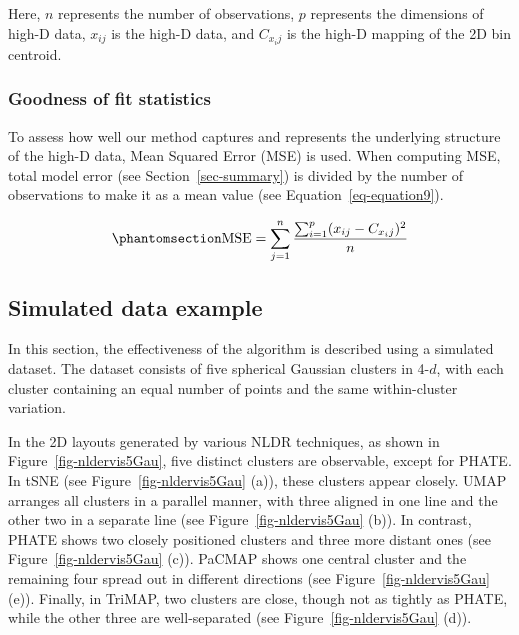 \documentclass[
  12pt]{article}
\begin{document}
Here, \(n\) represents the number of observations, \(p\) represents the
dimensions of high-D data, \(x_{ij}\) is the high-D data, and
\(C_{x_ij}\) is the high-D mapping of the 2D bin centroid.

\subsubsection{Goodness of fit statistics}\label{sec-goodfit}

To assess how well our method captures and represents the underlying
structure of the high-D data, Mean Squared Error (MSE) is used. When
computing MSE, total model error (see Section~\ref{sec-summary}) is
divided by the number of observations to make it as a mean value (see
Equation~\ref{eq-equation9}).

\begin{equation}\phantomsection\label{eq-equation9}{
\text{MSE} = \sum_{j = 1}^{n} \frac{\sum_{i = 1}^{p} (x_{ij} - C_{x_ij})^2}{n}
}\end{equation}

\subsection{Simulated data example}\label{sec-simpleex}

In this section, the effectiveness of the algorithm is described using a
simulated dataset. The dataset consists of five spherical Gaussian
clusters in 4-\(d\), with each cluster containing an equal number of
points and the same within-cluster variation.

In the 2D layouts generated by various NLDR techniques, as shown in
Figure~\ref{fig-nldervis5Gau}, five distinct clusters are observable,
except for PHATE. In tSNE (see Figure~\ref{fig-nldervis5Gau} (a)), these
clusters appear closely. UMAP arranges all clusters in a parallel
manner, with three aligned in one line and the other two in a separate
line (see Figure~\ref{fig-nldervis5Gau} (b)). In contrast, PHATE shows
two closely positioned clusters and three more distant ones (see
Figure~\ref{fig-nldervis5Gau} (c)). PaCMAP shows one central cluster and
the remaining four spread out in different directions (see
Figure~\ref{fig-nldervis5Gau} (e)). Finally, in TriMAP, two clusters are
close, though not as tightly as PHATE, while the other three are
well-separated (see Figure~\ref{fig-nldervis5Gau} (d)).
\end{document}
